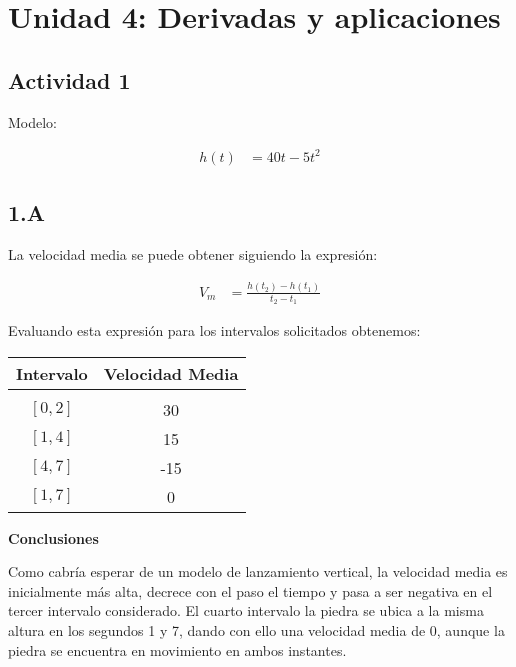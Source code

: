 \section*{Unidad 4: Derivadas y aplicaciones}
%
\subsection*{Actividad 1}

Modelo:

\begin{align*}
	h(t) &= 40t - 5t^2
\end{align*}

\subsection*{1.A}

La velocidad media se puede obtener siguiendo la expresión:

\begin{align*}
	V_m &= \frac{h(t_2) - h(t_1)}{t_2 - t_1}
\end{align*}

Evaluando esta expresión para los intervalos solicitados obtenemos:

\begin{center}
\begin{tabular}{ c c }
	Intervalo	&	Velocidad Media \\
	\hline \\
	$[0, 2]$	&	30\\	
	$[1, 4]$	&	15\\
	$[4, 7]$	&	-15\\
	$[1, 7]$	&	0
\end{tabular}
\end{center}

\textbf{Conclusiones}

Como cabría esperar de un modelo de lanzamiento vertical, la velocidad media 
es inicialmente más alta, decrece con el paso el tiempo y 
pasa a ser negativa en el tercer intervalo considerado. 
El cuarto intervalo la piedra se ubica a la misma altura en los segundos 1 y 7,
dando con ello una velocidad media de 0, aunque la piedra se encuentra en 
movimiento en ambos instantes.
